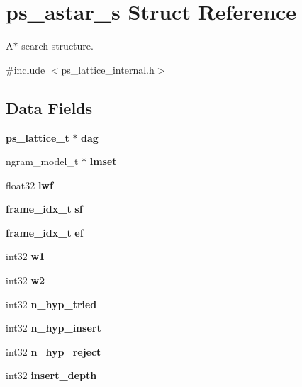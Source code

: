 \section{ps\+\_\+astar\+\_\+s Struct Reference}
\label{structps__astar__s}


A$\ast$ search structure.  




{\ttfamily \#include $<$ps\+\_\+lattice\+\_\+internal.\+h$>$}

\subsection*{Data Fields}
\begin{DoxyCompactItemize}
\item 
\mbox{\label{structps__astar__s_a3c6c2135760c306452e7f5b995091576}} 
\textbf{ ps\+\_\+lattice\+\_\+t} $\ast$ {\bfseries dag}
\item 
\mbox{\label{structps__astar__s_a5b7f214f56369c27753e66046fc8ef5c}} 
ngram\+\_\+model\+\_\+t $\ast$ {\bfseries lmset}
\item 
\mbox{\label{structps__astar__s_a9b1624982f8e671404581ac8b372a445}} 
float32 {\bfseries lwf}
\item 
\mbox{\label{structps__astar__s_a89a18074075a7793803b242bbe8a3028}} 
\textbf{ frame\+\_\+idx\+\_\+t} {\bfseries sf}
\item 
\mbox{\label{structps__astar__s_aa2104e1a0a3b369582b5fa920ffa51e6}} 
\textbf{ frame\+\_\+idx\+\_\+t} {\bfseries ef}
\item 
\mbox{\label{structps__astar__s_ad1ada6d9fe189e9f7c028ade731967b2}} 
int32 {\bfseries w1}
\item 
\mbox{\label{structps__astar__s_aa3fcb0733516a2740086969c4b4c88e4}} 
int32 {\bfseries w2}
\item 
\mbox{\label{structps__astar__s_ad8eb709a4df4d04112578b3cb390e1c5}} 
int32 {\bfseries n\+\_\+hyp\+\_\+tried}
\item 
\mbox{\label{structps__astar__s_abd46619036fe6ff13ca9d2ca5b76512b}} 
int32 {\bfseries n\+\_\+hyp\+\_\+insert}
\item 
\mbox{\label{structps__astar__s_a3de51b20d960b50aec4d908af5e43787}} 
int32 {\bfseries n\+\_\+hyp\+\_\+reject}
\item 
\mbox{\label{structps__astar__s_a50798b1396b3f565b2584ffeb1245b5d}} 
int32 {\bfseries insert\+\_\+depth}
\item 
\mbox{\label{structps__astar__s_a12ba7d143c867b1f1e55dfdfae3e6236}} 

\end{DoxyCompactItemize}
